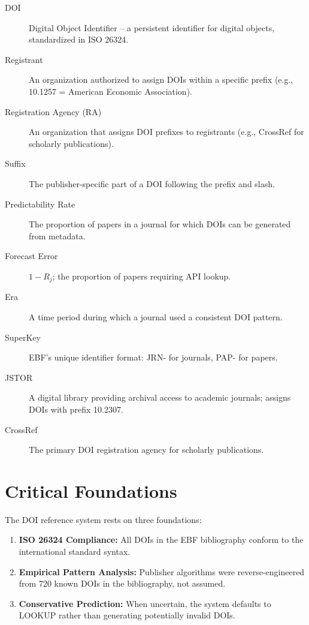 \begin{description}
    \item[DOI] Digital Object Identifier -- a persistent identifier for digital objects, standardized in ISO 26324.

    \item[Registrant] An organization authorized to assign DOIs within a specific prefix (e.g., 10.1257 = American Economic Association).

    \item[Registration Agency (RA)] An organization that assigns DOI prefixes to registrants (e.g., CrossRef for scholarly publications).

    \item[Suffix] The publisher-specific part of a DOI following the prefix and slash.

    \item[Predictability Rate] The proportion of papers in a journal for which DOIs can be generated from metadata.

    \item[Forecast Error] $1 - R_j$; the proportion of papers requiring API lookup.

    \item[Era] A time period during which a journal used a consistent DOI pattern.

    \item[SuperKey] EBF's unique identifier format: JRN- for journals, PAP- for papers.

    \item[JSTOR] A digital library providing archival access to academic journals; assigns DOIs with prefix 10.2307.

    \item[CrossRef] The primary DOI registration agency for scholarly publications.
\end{description}

\section{Critical Foundations}
\label{sec:foundations}

The DOI reference system rests on three foundations:

\begin{enumerate}
    \item \textbf{ISO 26324 Compliance:} All DOIs in the EBF bibliography conform to the international standard syntax.

    \item \textbf{Empirical Pattern Analysis:} Publisher algorithms were reverse-engineered from 720 known DOIs in the bibliography, not assumed.

    \item \textbf{Conservative Prediction:} When uncertain, the system defaults to LOOKUP rather than generating potentially invalid DOIs.
\end{enumerate}

